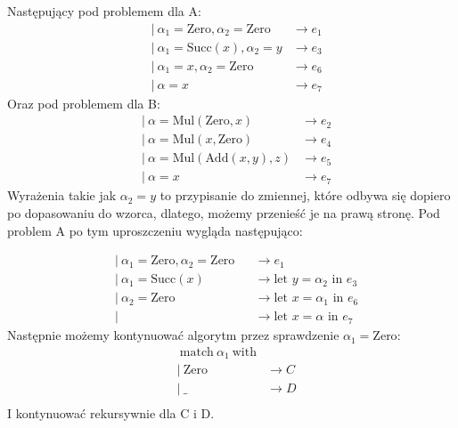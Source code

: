\documentclass{article}
\begin{document}
Następujący pod problemem dla A:
\begin{align*}
   & |\ \alpha_1 = \text{Zero}, \alpha_2 = \text{Zero} & \rightarrow e_1 \\
   & |\ \alpha_1 = \text{Succ}(x), \alpha_2 = y        & \rightarrow e_3 \\
   & |\ \alpha_1 = x, \alpha_2 = \text{Zero}           & \rightarrow e_6 \\
   & |\ \alpha = x                                     & \rightarrow e_7
\end{align*}
Oraz pod problemem dla B:
\begin{align*}
   & |\ \alpha = \text{Mul}(\text{Zero}, x)     & \rightarrow e_2 \\
   & |\ \alpha = \text{Mul}(x, \text{Zero})     & \rightarrow e_4 \\
   & |\ \alpha = \text{Mul}(\text{Add}(x,y), z) & \rightarrow e_5 \\
   & |\ \alpha = x                              & \rightarrow e_7
\end{align*}
Wyrażenia takie jak $\alpha_2=y$ to przypisanie do zmiennej, które odbywa się dopiero po dopasowaniu do wzorca, dlatego, możemy przenieść je na prawą stronę. Pod problem A po tym uproszczeniu wygląda następująco:

\begin{align*}
   & |\ \alpha_1 = \text{Zero}, \alpha_2 = \text{Zero} &  & \rightarrow e_1                                     \\
   & |\ \alpha_1 = \text{Succ}(x)                      &  & \rightarrow\text{let } y = \alpha_2 \text{ in }e_3  \\
   & |\ \alpha_2 = \text{Zero}                         &  & \rightarrow\text{let } x = \alpha_1 \text{ in } e_6 \\
   & |\                                                &  & \rightarrow\text{let } x = \alpha \text{ in } e_7
\end{align*}
Następnie możemy kontynuować algorytm przez sprawdzenie $\alpha_1=\text{Zero}$:
\begin{align*}
   & \ \text{match}\ \alpha_1\ \text{with}                 \\
   & |\  \text{Zero}                       & \rightarrow C \\
   & |\ \_                                 & \rightarrow D \\
\end{align*}
I kontynuować rekursywnie dla C i D.
\end{document}

